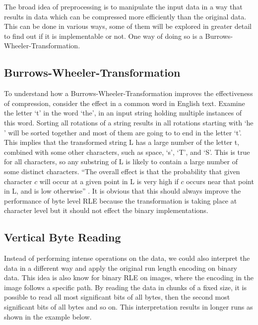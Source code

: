 The broad idea of preprocessing is to manipulate the input data in a way that results in data which can be compressed more efficiently than the original data. This can be done in various ways, some of them will be explored in greater detail to find out if it is implementable or not. One way of doing so is a Burrows-Wheeler-Transformation.

\subsection{Burrows-Wheeler-Transformation}
\label{ch:Analysis:sec:Improvements by Preprocessing:subSec:bwt}
\par{
To understand how a Burrows-Wheeler-Transformation improves the effectiveness of compression, consider the effect in a common word in English text. Examine the letter ‘t’ in the word ‘the’, in an input string holding multiple instances of this word. Sorting all rotations of a string results in all rotations starting with ‘he ’ will be sorted together and most of them are going to to end in the letter ‘t’. This implies that the transformed string L has a large number of the letter t, combined with some other characters, such as space, ‘s’, ‘T’, and ‘S’. This is true for all characters, so any substring of L is likely to contain a large number of some distinct characters. \enquote{The overall effect is that the probability that given character $c$ will occur at a given point in L is very high if $c$ occurs near that point in L, and is low otherwise} \cite{Burrows94}. It is obvious that this should always improve the performance of byte level RLE because the transformation is taking place at character level but it should not effect the binary implementations. 
}

\subsection{Vertical Byte Reading}
\label{ch:Analysis:sec:Improvements by Preprocessing:subSec:vertReading}
Instead of performing intense operations on the data, we could also interpret the data in a different way and apply the original run length encoding on binary data. This idea is also know for binary RLE on images, where the encoding in the image follows a specific path. By reading the data in chunks of a fixed size, it is possible to read all most significant bits of all bytes, then the second most significant bits of all bytes and so on. This interpretation results in longer runs as shown in the example below.


